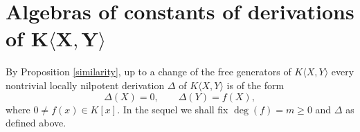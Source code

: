\section[Algebras of constants of derivations of $K\langle X,Y\rangle$]{Algebras of constants of derivations of $\boldsymbol{K\langle X,Y\rangle}$}

By Proposition \ref{similarity}, up to a change of the free generators of $K\langle X,Y\rangle$ every nontrivial locally nilpotent derivation $\Delta$ of $K\langle X,Y\rangle$ is of the form
\[
\Delta(X)=0,\qquad \Delta(Y)=f(X),
\]
where $0\not=f(x)\in K[x]$. In the sequel we shall fix $\deg(f)=m\geq 0$ and $\Delta$ as defined above.
